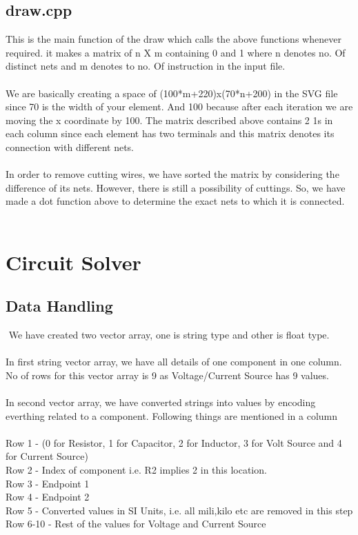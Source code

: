 \documentclass{scrreprt}
\begin{document}
\section{draw.cpp}
$ $
\\
This is the main function of the draw which calls the above functions whenever required.
it makes a matrix of n X m containing 0 and 1 where n denotes no. Of distinct nets and m denotes to no. Of instruction in the input file.
\\
\\
We are basically creating a space of (100*m+220)x(70*n+200) in the SVG file since 70 is the width of your element. And 100 because after each iteration we are moving the x coordinate by 100. The matrix described above contains 2 1s in each column since each element has two terminals and this matrix denotes its connection with different nets.
\\
\\
In order to remove cutting wires, we have sorted the matrix by considering the difference
of its nets. However, there is still a possibility of cuttings. So, we have made a dot function above to determine the exact nets to which it is connected.\\
\\
$ $
\chapter{Circuit Solver}

\section{Data Handling}
$ $ We have created two vector array, one is string type and other is float type.\\
\\
In first string vector array, we have all details of one component in one column. No of rows for this vector array is 9 as Voltage/Current Source has 9 values.\\
\\
In second vector array, we have converted strings into values by encoding everthing related to a component. Following things are mentioned in a column\\
\\
\indent Row 1 - (0 for Resistor, 1 for Capacitor, 2 for Inductor, 3 for Volt Source and 4 for \indent Current Source)\\
\indent Row 2 - Index of component i.e. R2 implies 2 in this location. \\
\indent Row 3 - Endpoint 1 \\
\indent Row 4 - Endpoint 2 \\
\indent Row 5 - Converted values in SI Units, i.e. all mili,kilo etc are removed in this step\\
\indent Row 6-10 - Rest of the values for Voltage and Current Source\\
\\ $ $
\end{document}

